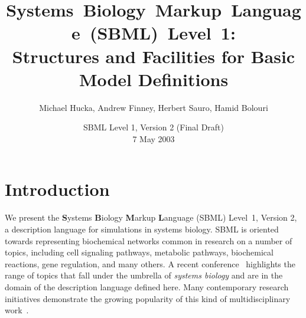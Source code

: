 \documentclass[10pt]{cekarticle}
\newcommand{\changed}[1]{\textcolor{BrickRed}{#1}}
\begin{document}

\title{\mbox{Systems Biology Markup Language (SBML) Level 1:}\\
  Structures and Facilities for Basic Model Definitions}

\author{Michael Hucka, Andrew Finney, Herbert Sauro, Hamid Bolouri}


\address{Systems Biology Workbench Development Group\\
  JST ERATO Kitano Symbiotic Systems Project\\
  Control and Dynamical Systems, MC 107-81\\
  California Institute of Technology, Pasadena, CA 91125, USA\\[3pt]
  \url{http://www.cds.caltech.edu/erato}}



\date{\vspace*{-1ex}SBML Level 1, \changed{Version 2 (Final Draft)}\\[3pt]
  \changed{7 May 2003}\vspace*{-10pt}}

\renewcommand{\baselinestretch}{0.96}
\maketitlepage
\renewcommand{\baselinestretch}{0.98}


\section{Introduction}
\label{sec:introduction}

We present the \textbf{S}ystems \textbf{B}iology \textbf{M}arkup
\textbf{L}anguage (SBML) Level~1\changed{, Version 2}, a description
language for simulations in systems biology.  SBML is oriented towards
representing biochemical networks common in research on a number of topics,
including cell signaling pathways, metabolic pathways, biochemical
reactions, gene regulation, and many others.  A recent
conference~\citep{kitano:2001} highlights the range of topics that fall
under the umbrella of \emph{systems biology} and are in the domain of the
description language defined here.  Many contemporary research initiatives
demonstrate the growing popularity of this kind of multidisciplinary
work~\cite[e.g.,][]{abbott:1999,gilman:2000,popel:1998,smaglik:2000,smaglik:2000b}.
\end{document}
